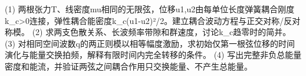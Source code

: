 (1) 两根张力T、线密度mu相同的无限弦，位移u1,u2由每单位长度弹簧耦合刚度k_c>0连接，弹性耦合能密度k_c(u1-u2)²/2。建立耦合波动方程与正交对称/反对称模。
(2) 求两支色散关系、长波频率带隙和群速度，讨论k_c趋零时的简并。
(3) 对相同空间波数q的两正则模以相等幅度激励，求初始仅第一根弦位移的时间演化与能量交换拍频，解释有限时间内完全转移的条件。
(4) 写出完整非负总能量密度和能流，并验证两弦之间耦合作用只交换能量、不产生总能量。
